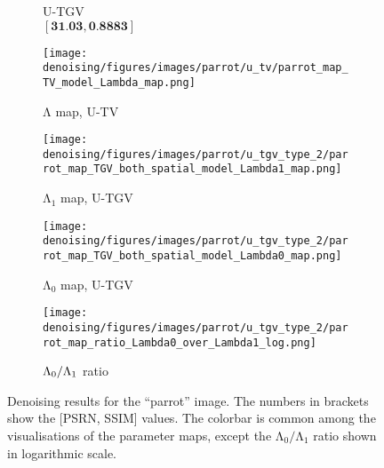 \begin{figure}[!t]
\begin{subfigure}[t]{0.24\textwidth}
        \caption{U-TGV  \\ $[\textbf{31.03},\textbf{0.8883}]$ \newline}
    \end{subfigure}
    \hfill \vspace{-0.2cm}
    \begin{subfigure}[t]{0.24\textwidth}
        \texttt{[image: denoising/figures/images/parrot/u\_tv/parrot\_map\_TV\_model\_Lambda\_map.png]}
        \caption{$\mathrm{\Lambda}$ map, U-TV \newline}
    \end{subfigure}
        \hfill
    \begin{subfigure}[t]{0.24\textwidth}
        \texttt{[image: denoising/figures/images/parrot/u\_tgv\_type\_2/parrot\_map\_TGV\_both\_spatial\_model\_Lambda1\_map.png]}
        \caption{$\mathrm{\Lambda}_1$ map, U-TGV }
    \end{subfigure}
    \hfill
    \begin{subfigure}[t]{0.24\textwidth}
        \texttt{[image: denoising/figures/images/parrot/u\_tgv\_type\_2/parrot\_map\_TGV\_both\_spatial\_model\_Lambda0\_map.png]}
        \caption{$\mathrm{\Lambda}_0$ map, U-TGV}
    \end{subfigure}
    \hfill
    \begin{subfigure}[t]{0.24\textwidth}
        \texttt{[image: denoising/figures/images/parrot/u\_tgv\_type\_2/parrot\_map\_ratio\_Lambda0\_over\_Lambda1\_log.png]}
        \caption{$\mathrm{\Lambda}_0/\mathrm{\Lambda}_1$ ratio %
        }
    \end{subfigure}
     \hfill \vspace{-0.3cm}
    \begin{subfigure}[t]{1\textwidth}
    \centering
    \end{subfigure}

    \caption{
    Denoising results for the ``parrot'' image. The numbers in brackets show the [PSRN, SSIM] values. The colorbar is common among the visualisations of the parameter maps, except
    the $\mathrm{\Lambda}_0/\mathrm{\Lambda}_1$ ratio shown in logarithmic scale. 
    }
    \label{fig:parrot_test_case_noise_0_10}
\end{figure}
